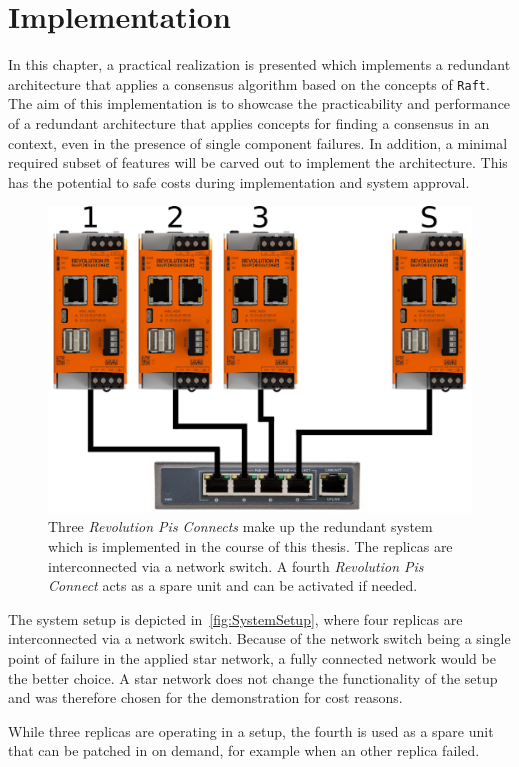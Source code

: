 \chapter{Implementation}
\label{cpt:Implementation}

In this chapter, a practical realization is presented which implements a redundant architecture that applies a consensus algorithm based on the concepts of \texttt{Raft}.
The aim of this implementation is to showcase the practicability and performance of a redundant architecture that applies  concepts for finding a consensus in an  context, even in the presence of single component failures.
In addition, a minimal required subset of  features will be carved out to implement the architecture.
This has the potential to safe costs during implementation and system approval.
\\

\begin{figure}[!hb]
	\centering
	\includegraphics[width=0.7\linewidth]{images/setup}
	\caption{Three \textit{Revolution Pis Connects} make up the redundant system which is implemented in the course of this thesis. The replicas are interconnected via a network switch. A fourth \textit{Revolution Pis Connect} acts as a spare unit and can be activated if needed.}
	\label{fig:SystemSetup}
\end{figure}

The system setup is depicted in~\autoref{fig:SystemSetup}, where four replicas are interconnected via a network switch.
Because of the network switch being a single point of failure in the applied star network, a fully connected network would be the better choice.
A star network does not change the functionality of the setup and was therefore chosen for the demonstration for cost reasons.

While three replicas are operating in a  setup, the fourth is used as a spare unit that can be patched in on demand, for example when an other replica failed.

